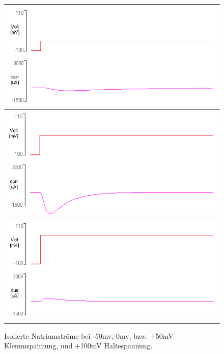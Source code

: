\documentclass[a4paper]{article}
\begin{document}
\begin{figure}[H]
    \centering
    \begin{tabular}{|c|}
        \hline
         \includegraphics{images/Aufgabe3_4-ClampMinus50-TEA_Graph.png} \\
         \hline
         \includegraphics{images/Aufgabe3_4-Clamp0-TEA_Graph.png}\\
         \hline
         \includegraphics{images/Aufgabe3_4-Clamp50-TEA_Graph.png}\\
         \hline
    \end{tabular}
    \caption{Isolierte Natriumströme bei -50mv, 0mv, bzw. +50mV Klemmspannung, und +100mV Haltespannung.}
    \label{fig:A3_4a}
\end{figure}
\end{document}
